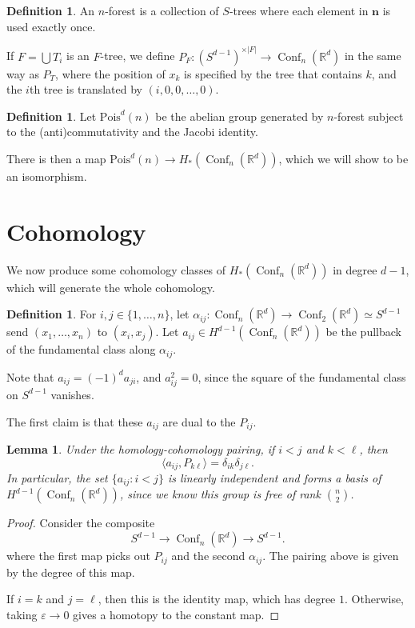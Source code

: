 \documentclass{shortart}
\newtheorem{lemma}[thm]{Lemma}
\theoremstyle{definition}
\newtheorem{defi}[thm]{Definition}
\DeclareMathOperator\Conf{Conf}
\newcommand\R{\mathbb{R}}
\newcommand\Pois{\mathrm{Pois}}
\begin{document}
\begin{defi}
  An $n$-forest is a collection of $S$-trees where each element in $\mathbf{n}$ is used exactly once. 

  If $F = \bigcup T_i$ is an $F$-tree, we define $P_F: (S^{d - 1})^{\times |F|} \to \Conf_n(\R^d)$ in the same way as $P_T$, where the position of $x_k$ is specified by the tree that contains $k$, and the $i$th tree is translated by $(i, 0, 0, \ldots, 0)$.
\end{defi}

\begin{defi}
  Let $\Pois^d(n)$ be the abelian group generated by $n$-forest subject to the (anti)commutativity and the Jacobi identity.
\end{defi}

There is then a map $\Pois^d(n) \to H_*(\Conf_n(\R^d))$, which we will show to be an isomorphism.

\section{Cohomology}
We now produce some cohomology classes of $H_*(\Conf_n(\R^d))$ in degree $d - 1$, which will generate the whole cohomology.

\begin{defi}
  For $i, j \in \{1, \ldots, n\}$, let $\alpha_{ij}: \Conf_n(\R^d) \to \Conf_2(\R^d) \simeq S^{d - 1}$ send $(x_1, \ldots, x_n)$ to $(x_i, x_j)$. Let $a_{ij} \in H^{d - 1}(\Conf_n(\R^d))$ be the pullback of the fundamental class along $\alpha_{ij}$.
\end{defi}

Note that $a_{ij} = (-1)^d a_{ji}$, and $a_{ij}^2 = 0$, since the square of the fundamental class on $S^{d - 1}$ vanishes.

The first claim is that these $a_{ij}$ are dual to the $P_{ij}$.
\begin{lemma}
  Under the homology-cohomology pairing, if $i < j$ and $k < \ell$, then
  \[
    \langle a_{ij}, P_{k\ell}\rangle = \delta_{ik} \delta_{j\ell}.
  \]
  In particular, the set $\{a_{ij}: i < j\}$ is linearly independent and forms a basis of $H^{d - 1}(\Conf_n(\R^d))$, since we know this group is free of rank $\binom{n}{2}$.
\end{lemma}

\begin{proof}
  Consider the composite
  \[
    S^{d - 1} \to \Conf_n(\R^d) \to S^{d - 1}.
  \]
  where the first map picks out $P_{ij}$ and the second $\alpha_{ij}$. The pairing above is given by the degree of this map.

  If $i = k$ and $j = \ell$, then this is the identity map, which has degree $1$. Otherwise, taking $\varepsilon \to 0$ gives a homotopy to the constant map.
\end{proof}
\end{document}

